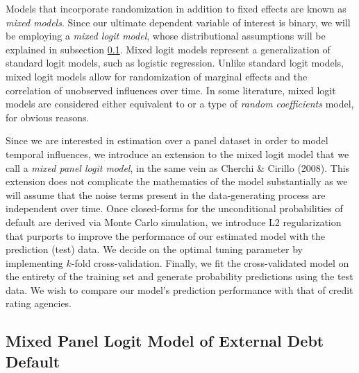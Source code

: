 \documentclass[12pt]{article}
\begin{document}
Models that incorporate randomization in addition to fixed effects are known as \textit{mixed models}. Since our ultimate dependent variable of interest is binary, we will be employing a \textit{mixed logit model}, whose distributional assumptions will be explained in subsection \ref{ssec:model}. Mixed logit models represent a generalization of standard logit models, such as logistic regression. Unlike standard logit models, mixed logit models allow for randomization of marginal effects and the correlation of unobserved influences over time. In some literature, mixed logit models are considered either equivalent to or a type of \textit{random coefficients} model, for obvious reasons.

Since we are interested in estimation over a panel dataset in order to model temporal influences, we introduce an extension to the mixed logit model that we call a \textit{mixed panel logit model}, in the same vein as Cherchi \& Cirillo (2008). This extension does not complicate the mathematics of the model substantially as we will assume that the noise terms present in the data-generating process are independent over time. Once closed-forms for the unconditional probabilities of default are derived via Monte Carlo simulation, we introduce L2 regularization that purports to improve the performance of our estimated model with the prediction (test) data. We decide on the optimal tuning parameter by implementing $k$-fold cross-validation. Finally, we fit the cross-validated model on the entirety of the training set and generate probability predictions using the test data. We wish to compare our model's prediction performance with that of credit rating agencies.

\subsection{Mixed Panel Logit Model of External Debt Default} \label{ssec:model}
\end{document}
